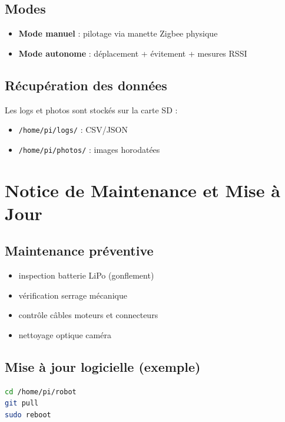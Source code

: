 \documentclass[a4paper,12pt]{report}
\begin{document}
\section{Modes}
\begin{itemize}
    \item \textbf{Mode manuel} : pilotage via manette Zigbee physique
    \item \textbf{Mode autonome} : déplacement + évitement + mesures RSSI
\end{itemize}

\section{Récupération des données}
Les logs et photos sont stockés sur la carte SD :
\begin{itemize}
    \item \texttt{/home/pi/logs/} : CSV/JSON
    \item \texttt{/home/pi/photos/} : images horodatées
\end{itemize}

\chapter{Notice de Maintenance et Mise à Jour}

\section{Maintenance préventive}
\begin{itemize}
    \item inspection batterie LiPo (gonflement)
    \item vérification serrage mécanique
    \item contrôle câbles moteurs et connecteurs
    \item nettoyage optique caméra
\end{itemize}

\section{Mise à jour logicielle (exemple)}
\begin{lstlisting}[language=bash]
cd /home/pi/robot
git pull
sudo reboot
\end{lstlisting}
\end{document}
